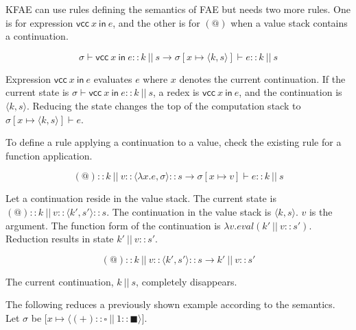 KFAE can use rules defining the semantics of FAE but needs two more rules. One is
for expression $\textsf{vcc}\ x\ \textsf{in}\ e$, and the other is for $(@)$ when
a value stack contains a continuation.

\[
\sigma\vdash\textsf{vcc}\ x\ \textsf{in}\ e::k\ ||\ s\rightarrow
\sigma[x\mapsto\langle k,s\rangle]\vdash e::k\ ||\ s
\]

Expression $\textsf{vcc}\ x\ \textsf{in}\ e$ evaluates $e$ where $x$ denotes the
current continuation. If the current state is $\sigma\vdash\textsf{vcc}\ x\
\textsf{in}\ e::k\ ||\ s$, a redex is $\textsf{vcc}\ x\ \textsf{in}\ e$, and the
continuation is $\langle k,s\rangle$. Reducing the state changes the top of the
computation stack to $\sigma[x\mapsto\langle k,s\rangle]\vdash e$.

To define a rule applying a continuation to a value, check the existing rule for
a function application.

\[
(@)::k\ ||\ v::\langle\lambda x.e,\sigma\rangle::s\rightarrow
\sigma[x\mapsto v]\vdash e::k\ ||\ s
\]

Let a continuation reside in the value stack. The current state is $(@)::k\ ||\
v::\langle k',s'\rangle::s$. The continuation in the value stack is $\langle
k,s\rangle$. $v$ is the argument. The function form of the continuation is
$\lambda v.\mathit{eval}(k'\ ||\ v::s')$. Reduction results in state $k'\ ||\
v::s'$.

\[
(@)::k\ ||\ v::\langle k',s'\rangle::s\rightarrow
k'\ ||\ v::s'
\]

The current continuation, $k\ ||\ s$, completely disappears.

The following reduces a previously shown example according to the semantics. Let
$\sigma$ be $\lbrack x\mapsto\langle(+)::\square\ ||\
1::\blacksquare\rangle\rbrack$.

